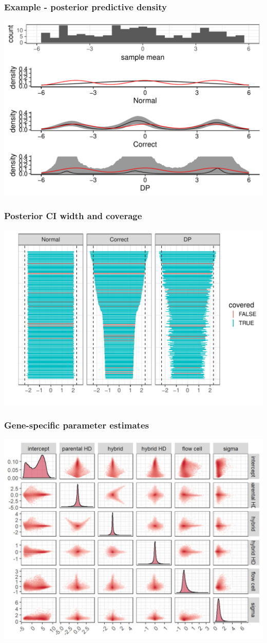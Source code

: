 \documentclass{beamer}
\begin{document}
\begin{frame}%
  \frametitle{Example - posterior predictive density}
  \centering
  \includegraphics[height=.92\textheight]{predictive_12_5}
\end{frame}

\begin{frame}%
  \frametitle{Posterior CI width and coverage}
  {
    \centering
    \includegraphics[height=.95\textheight]{cis_12_5}
  }
\end{frame}

\begin{frame}%
  \frametitle{Gene-specific parameter estimates}
  {
    \centering
    \includegraphics[width=.8\textwidth]{pairs1} \\
  }
\end{frame}
\end{document}
